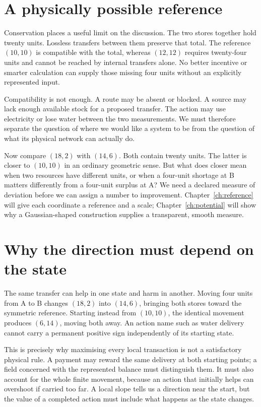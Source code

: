 \section{A physically possible reference}
Conservation places a useful limit on the discussion. The two stores together hold twenty units. Lossless transfers between them preserve that total. The reference $(10,10)$ is compatible with the total, whereas $(12,12)$ requires twenty-four units and cannot be reached by internal transfers alone. No better incentive or smarter calculation can supply those missing four units without an explicitly represented input.

Compatibility is not enough. A route may be absent or blocked. A source may lack enough available stock for a proposed transfer. The action may use electricity or lose water between the two measurements. We must therefore separate the question of where we would like a system to be from the question of what its physical network can actually do.

Now compare $(18,2)$ with $(14,6)$. Both contain twenty units. The latter is closer to $(10,10)$ in an ordinary geometric sense. But what does closer mean when two resources have different units, or when a four-unit shortage at B matters differently from a four-unit surplus at A? We need a declared measure of deviation before we can assign a number to improvement. Chapter~\ref{ch:reference} will give each coordinate a reference and a scale; Chapter~\ref{ch:potential} will show why a Gaussian-shaped construction supplies a transparent, smooth measure.

\section{Why the direction must depend on the state}
The same transfer can help in one state and harm in another. Moving four units from A to B changes $(18,2)$ into $(14,6)$, bringing both stores toward the symmetric reference. Starting instead from $(10,10)$, the identical movement produces $(6,14)$, moving both away. An action name such as water delivery cannot carry a permanent positive sign independently of its starting state.

This is precisely why maximising every local transaction is not a satisfactory physical rule. A payment may reward the same delivery at both starting points; a field concerned with the represented balance must distinguish them. It must also account for the whole finite movement, because an action that initially helps can overshoot if carried too far. A local slope tells us a direction near the start, but the value of a completed action must include what happens as the state changes.

